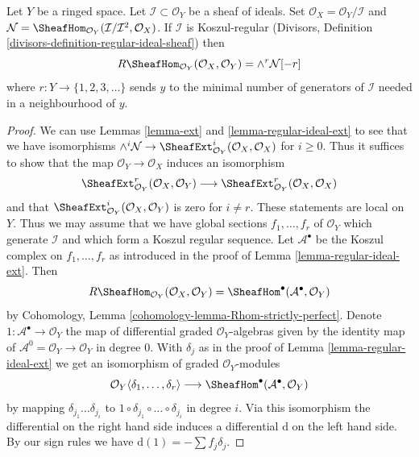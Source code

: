 \begin{lemma}
\label{lemma-regular-immersion-ext}
Let $Y$ be a ringed space. Let $\mathcal{I} \subset \mathcal{O}_Y$
be a sheaf of ideals. Set $\mathcal{O}_X = \mathcal{O}_Y/\mathcal{I}$ and
$\mathcal{N} =
\SheafHom_{\mathcal{O}_Y}(\mathcal{I}/\mathcal{I}^2, \mathcal{O}_X)$.
If $\mathcal{I}$ is Koszul-regular
(Divisors, Definition \ref{divisors-definition-regular-ideal-sheaf}) then
$$
R\SheafHom_{\mathcal{O}_Y}(\mathcal{O}_X, \mathcal{O}_Y) =
\wedge^r \mathcal{N}[-r]
$$
where $r : Y \to \{1, 2, 3, \ldots \}$ sends $y$ to
the minimal number of generators of $\mathcal{I}$ needed in a neighbourhood
of $y$.
\end{lemma}

\begin{proof}
We can use Lemmas \ref{lemma-ext} and \ref{lemma-regular-ideal-ext}
to see that we have isomorphisms
$\wedge^i\mathcal{N} \to
\SheafExt^i_{\mathcal{O}_Y}(\mathcal{O}_X, \mathcal{O}_X)$
for $i \geq 0$. Thus it suffices to show that the map
$\mathcal{O}_Y \to \mathcal{O}_X$ induces an isomorphism
$$
\SheafExt^r_{\mathcal{O}_Y}(\mathcal{O}_X, \mathcal{O}_Y)
\longrightarrow
\SheafExt^r_{\mathcal{O}_Y}(\mathcal{O}_X, \mathcal{O}_X)
$$
and that
$\SheafExt^i_{\mathcal{O}_Y}(\mathcal{O}_X, \mathcal{O}_Y)$
is zero for $i \not = r$. These statements are local on $Y$. Thus
we may assume that we have global sections $f_1, \ldots, f_r$ of
$\mathcal{O}_Y$ which generate $\mathcal{I}$ and which form a
Koszul regular sequence. Let $\mathcal{A}^\bullet$
be the Koszul complex on $f_1, \ldots, f_r$ as introduced in the proof of
Lemma \ref{lemma-regular-ideal-ext}. Then
$$
R\SheafHom_{\mathcal{O}_Y}(\mathcal{O}_X, \mathcal{O}_Y) =
\SheafHom^\bullet(\mathcal{A}^\bullet, \mathcal{O}_Y)
$$
by Cohomology, Lemma \ref{cohomology-lemma-Rhom-strictly-perfect}.
Denote $1 : \mathcal{A}^\bullet \to \mathcal{O}_Y$ the map of differential
graded $\mathcal{O}_Y$-algebras given by the identity map of
$\mathcal{A}^0 = \mathcal{O}_Y \to \mathcal{O}_Y$ in degree $0$.
With $\delta_j$ as in the proof of Lemma \ref{lemma-regular-ideal-ext}
we get an isomorphism of graded $\mathcal{O}_Y$-modules
$$
\mathcal{O}_Y\langle \delta_1, \ldots, \delta_r\rangle
\longrightarrow
\SheafHom^\bullet(\mathcal{A}^\bullet, \mathcal{O}_Y)
$$
by mapping $\delta_{j_1} \ldots \delta_{j_i}$ to
$1 \circ \delta_{j_1} \circ \ldots \circ \delta_{j_i}$ in degree $i$.
Via this isomorphism the differential on the right hand side
induces a differential $\text{d}$ on the left hand side.
By our sign rules we have $\text{d}(1) = - \sum f_j \delta_j$.

\end{proof}
